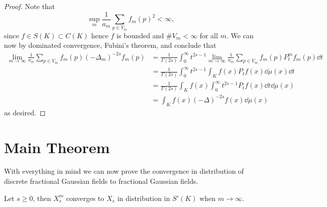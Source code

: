 \begin{proof}
	Note that 
	\begin{equation}
		\sup_{m} \frac{1}{a_m} \sum_{p \in V_m} f_m(p)^2 < \infty,
	\end{equation}
	 since $f \in S(K) \subset C(K)$ hence $f$ is bounded and $\# V_m < \infty$ for all $m$. We can now by dominated convergence, Fubini's theorem,  and  conclude that 
	\begin{align}
		\lim_{m \to \infty} \frac{1}{a_m} \sum_{p \in V_m} f_m(p) (-\Delta_{m})^{-2s} f_m(p) &= \frac{1}{\Gamma(2s)} \int_{0}^{\infty} t^{2s-1} \lim_{m \to \infty}\frac{1}{a_m} \sum_{p \in V_m} f_m(p) P_{t}^{m} f_m(p) \dd t \\
		&= \frac{1}{\Gamma(2s)} \int_{0}^{\infty} t^{2s-1} \int_{K} f(x) P_t f(x) \dd\mu(x) \dd t \\
		&= \frac{1}{\Gamma(2s)} \int_{K} f(x) \int_{0}^{\infty} t^{2s-1}P_t f(x) \dd t \dd\mu(x) \\
		&= \int_{K} f(x) (-\Delta)^{-2s}f(x) \dd \mu(x)
	\end{align}
	as desired.
\end{proof}


\section{Main Theorem}
With everything in mind we can now prove the convergence in distribution of discrete fractional Gaussian fields to fractional Gaussian fields.

\medskip
\begin{mainTheorem}
	Let $s \geq 0$, then $X_{s}^{m}$ converges to $X_s$ in distribution in $S'(K)$ when $m \to \infty$.
\end{mainTheorem}

